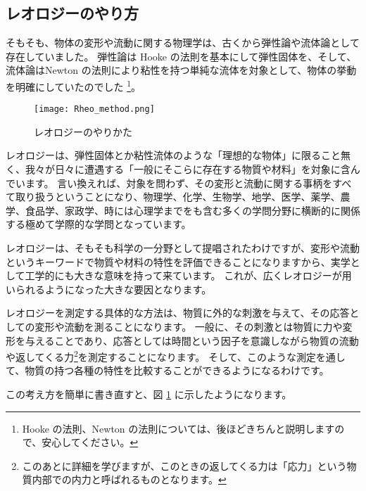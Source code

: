 \documentclass[uplatex,dvipdfmx,a4paper,11pt]{jsarticle}
\begin{document}
\subsection{レオロジーのやり方}

そもそも、物体の変形や流動に関する物理学は、古くから弾性論や流体論として存在していました。
弾性論は Hooke の法則を基本にして弾性固体を、そして、流体論はNewton の法則により粘性を持つ単純な流体を対象として、物体の挙動を明確にしていたのでした
\footnote{
	Hooke の法則、Newton の法則については、後ほどきちんと説明しますので、安心してください。
}。
\begin{figure}[htb]
    \begin{center}
        \texttt{[image: Rheo\_method.png]}
        \caption{レオロジーのやりかた}
        \label{yarikata}
    \end{center}
\end{figure}

レオロジーは、弾性固体とか粘性流体のような「理想的な物体」に限ること無く、我々が日々に遭遇する「一般にそこらに存在する物質や材料」を対象に含んでいます。
言い換えれば、対象を問わず、その変形と流動に関する事柄をすべて取り扱うということになり、物理学、化学、生物学、地学、医学、薬学、農学、食品学、家政学、時には心理学までをも含む多くの学問分野に横断的に関係する極めて学際的な学問となっています。

レオロジーは、そもそも科学の一分野として提唱されたわけですが、変形や流動というキーワードで物質や材料の特性を評価できることになりますから、実学として工学的にも大きな意味を持って来ています。
これが、広くレオロジーが用いられるようになった大きな要因となります。

レオロジーを測定する具体的な方法は、物質に外的な刺激を与えて、その応答としての変形や流動を測ることになります。
一般に、その刺激とは物質に力や変形を与えることであり、応答としては時間という因子を意識しながら物質の流動や返してくる力\footnote{
	このあとに詳細を学びますが、このときの返してくる力は「応力」という物質内部での内力と呼ばれるものとなります。
}を測定することになります。
そして、このような測定を通して、物質の持つ各種の特性を比較することができるようになるわけです。

この考え方を簡単に書き直すと、図 \ref{yarikata} に示したようになります。
\end{document}
